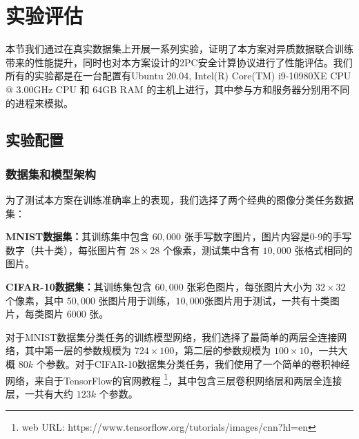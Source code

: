 \section{实验评估}\label{4-exp}
本节我们通过在真实数据集上开展一系列实验，证明了本方案对异质数据联合训练带来的性能提升，同时也对本方案设计的2PC安全计算协议进行了性能评估。我们所有的实验都是在一台配置有Ubuntu 20.04, Intel(R) Core(TM) i9-10980XE CPU @ 3.00GHz CPU 和 64GB RAM 的主机上进行，其中参与方和服务器分别用不同的进程来模拟。

\subsection{实验配置}

\subsubsection{数据集和模型架构}
为了测试本方案在训练准确率上的表现，我们选择了两个经典的图像分类任务数据集：
\begin{compactitem}
	\item \textbf{MNIST数据集：}其训练集中包含 $60,000$ 张手写数字图片，图片内容是0-9的手写数字（共十类），每张图片有 $28 \times28$ 个像素，测试集中含有 $10,000$ 张格式相同的图片。
	\item \textbf{CIFAR-10数据集：}其训练集包含 $60,000$ 张彩色图片，每张图片大小为 $32 \times 32$ 个像素，其中 $50,000$ 张图片用于训练，$10,000$张图片用于测试，一共有十类图片，每类图片 $6000$ 张。
\end{compactitem}
对于MNIST数据集分类任务的训练模型网络，我们选择了最简单的两层全连接网络，其中第一层的参数规模为 $724 \times 100$，第二层的参数规模为 $100 \times 10$，一共大概 $80k$ 个参数。对于CIFAR-10数据集分类任务，我们使用了一个简单的卷积神经网络，来自于TensorFlow的官网教程 \footnote{web URL: https://www.tensorflow.org/tutorials/images/cnn?hl=en}，其中包含三层卷积网络层和两层全连接层，一共有大约 $123k$ 个参数。

